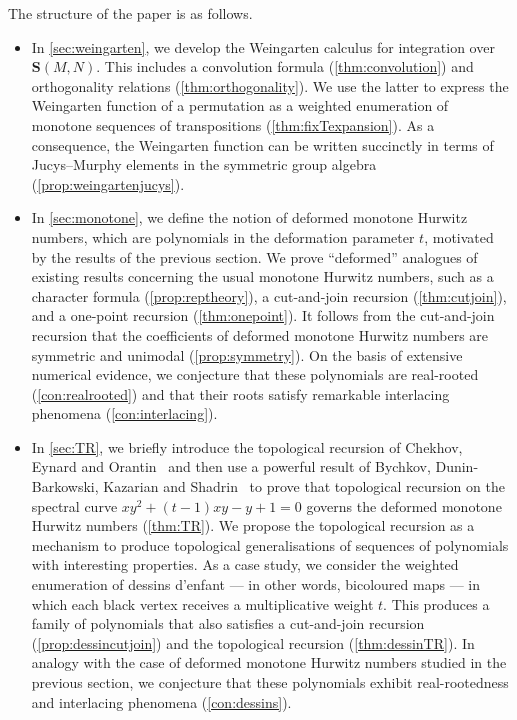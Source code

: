 \documentclass[a4paper]{article}
\theoremstyle{plain}
\numberwithin{theorem}{section}
\theoremstyle{definition}
\theoremstyle{remark}
\newcommand{\SM}{\mathbf{S}}			%
\begin{document}
The structure of the paper is as follows.
\begin{itemize}
\item In \cref{sec:weingarten}, we develop the Weingarten calculus for integration over $\SM(M,N)$. This includes a convolution formula (\cref{thm:convolution}) and orthogonality relations (\cref{thm:orthogonality}). We use the latter to express the Weingarten function of a permutation as a weighted enumeration of monotone sequences of transpositions (\cref{thm:fixTexpansion}). As a consequence, the Weingarten function can be written succinctly in terms of Jucys--Murphy elements in the symmetric group algebra (\cref{prop:weingartenjucys}).


\item In \cref{sec:monotone}, we define the notion of deformed monotone Hurwitz numbers, which are polynomials in the deformation parameter $t$, motivated by the results of the previous section. We prove ``deformed'' analogues of existing results concerning the usual monotone Hurwitz numbers, such as a character formula (\cref{prop:reptheory}), a cut-and-join recursion (\cref{thm:cutjoin}), and a one-point recursion (\cref{thm:onepoint}). It follows from the cut-and-join recursion that the coefficients of deformed monotone Hurwitz numbers are symmetric and unimodal (\cref{prop:symmetry}). On the basis of extensive numerical evidence, we conjecture that these polynomials are real-rooted (\cref{con:realrooted}) and that their roots satisfy remarkable interlacing phenomena (\cref{con:interlacing}).


\item In \cref{sec:TR}, we briefly introduce the topological recursion of Chekhov, Eynard and Orantin~\cite{che-eyn06, eyn-ora07} and then use a powerful result of Bychkov, Dunin-Barkowski, Kazarian and Shadrin~\cite{BDKS21} to prove that topological recursion on the spectral curve $xy^2 + (t-1)xy - y + 1 = 0$ governs the deformed monotone Hurwitz numbers (\cref{thm:TR}). We propose the topological recursion as a mechanism to produce topological generalisations of sequences of polynomials with interesting properties. As a case study, we consider the weighted enumeration of dessins d'enfant --- in other words, bicoloured maps --- in which each black vertex receives a multiplicative weight $t$. This produces a family of polynomials that also satisfies a cut-and-join recursion (\cref{prop:dessincutjoin}) and the topological recursion (\cref{thm:dessinTR}). In analogy with the case of deformed monotone Hurwitz numbers studied in the previous section, we conjecture that these polynomials exhibit real-rootedness and interlacing phenomena (\cref{con:dessins}).
\end{itemize}
\end{document}
